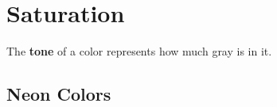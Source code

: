 \section{Saturation} 

  \begin{definition}[Tone]
    \label{def:tone}
    The \textbf{tone} of a color represents how much gray is in it. 
  \end{definition}

\subsection{Neon Colors}
